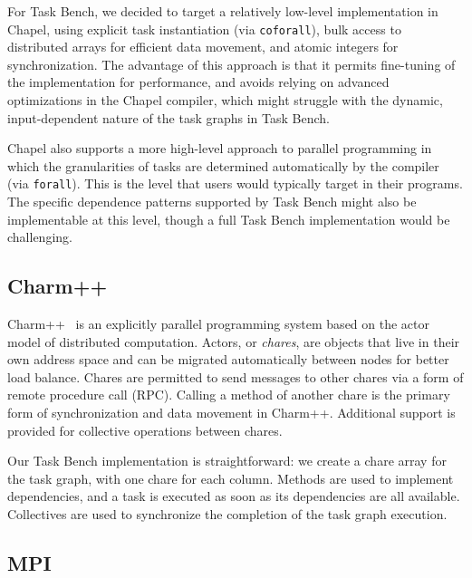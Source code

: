 For Task Bench, we decided to target a relatively low-level
implementation in Chapel, using explicit task instantiation (via
\lstinline[language=Chapel]{coforall}), bulk access to distributed
arrays for efficient data movement, and atomic integers for
synchronization. The advantage of this approach is that it permits
fine-tuning of the implementation for performance, and avoids relying
on advanced optimizations in the Chapel compiler, which might struggle
with the dynamic, input-dependent nature of the task graphs in Task
Bench.

Chapel also supports a more high-level approach to parallel
programming in which the granularities of tasks are determined
automatically by the compiler (via
\lstinline[language=Chapel]{forall}). This is the level that users
would typically target in their programs. The specific dependence
patterns supported by Task Bench might also be implementable at this
level, though a full Task Bench implementation would be challenging.


\subsection{Charm++}

Charm++~\cite{Charmpp93} is an explicitly parallel programming system
based on the actor model of distributed computation. Actors, or
\emph{chares}, are objects that live in their own address space and
can be migrated automatically between nodes for better load
balance. Chares are permitted to send messages to other chares via a
form of remote procedure call (RPC). Calling a method of another chare
is the primary form of synchronization and data movement in
Charm++. Additional support is provided for collective operations
between chares.

Our Task Bench implementation is straightforward: we create a chare
array for the task graph, with one chare for each column. Methods are
used to implement dependencies, and a task is executed as soon as its
dependencies are all available. Collectives are used to synchronize the
completion of the task graph execution.


\subsection{MPI}

